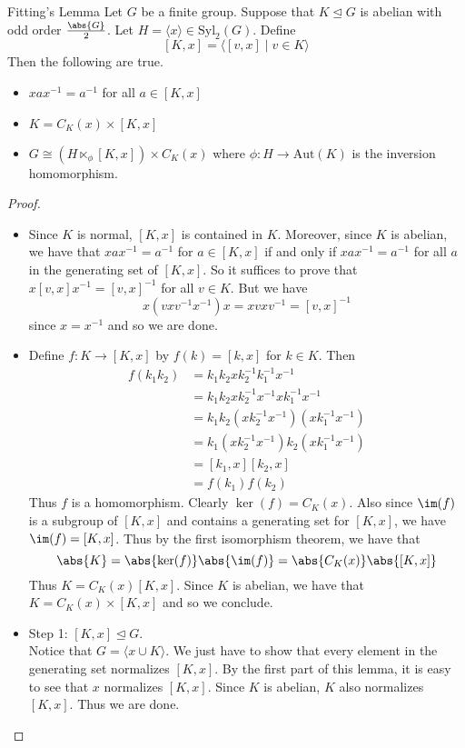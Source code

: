 \documentclass[a4paper]{article}
\begin{document}
\begin{lmm}{Fitting's Lemma}{} Let $G$ be a finite group. Suppose that $K\trianglelefteq G$ is abelian with odd order $\frac{\abs{G}}{2}$. Let $H=\langle x\rangle\in\text{Syl}_2(G)$. Define $$[K,x]=\langle[v,x]\;|\;v\in K\rangle$$ Then the following are true. 
\begin{itemize}
\item $xax^{-1}=a^{-1}$ for all $a\in[K,x]$
\item $K=C_K(x)\times[K,x]$
\item $G\cong(H\ltimes_\phi[K,x])\times C_K(x)$ where $\phi:H\to\text{Aut}(K)$ is the inversion homomorphism. 
\end{itemize} \tcbline
\begin{proof}~\\
\begin{itemize}
\item Since $K$ is normal, $[K,x]$ is contained in $K$. Moreover, since $K$ is abelian, we have that $xax^{-1}=a^{-1}$ for $a\in[K,x]$ if and only if $xax^{-1}=a^{-1}$ for all $a$ in the generating set of $[K,x]$. So it suffices to prove that $x[v,x]x^{-1}=[v,x]^{-1}$ for all $v\in K$. But we have $$x(vxv^{-1}x^{-1})x=xvxv^{-1}=[v,x]^{-1}$$ since $x=x^{-1}$ and so we are done. 
\item Define $f:K\to[K,x]$ by $f(k)=[k,x]$ for $k\in K$. Then 
\begin{align*}
f(k_1k_2)&=k_1k_2xk_2^{-1}k_1^{-1}x^{-1}\\
&=k_1k_2xk_2^{-1}x^{-1}xk_1^{-1}x^{-1}\\
&=k_1k_2(xk_2^{-1}x^{-1})(xk_1^{-1}x^{-1})\\
&=k_1(xk_2^{-1}x^{-1})k_2(xk_1^{-1}x^{-1})\tag{$K$ is abelian}\\
&=[k_1,x][k_2,x]\\
&=f(k_1)f(k_2)
\end{align*}
Thus $f$ is a homomorphism. Clearly $\ker(f)=C_K(x)$. Also since $\im(f)$ is a subgroup of $[K,x]$ and contains a generating set for $[K,x]$, we have $\im(f)=[K,x]$. Thus by the first isomorphism theorem, we have that $$\abs{K}=\abs{\ker(f)}\abs{\im(f)}=\abs{C_K(x)}\abs{[K,x]}$$ Thus $K=C_K(x)[K,x]$. Since $K$ is abelian, we have that $K=C_K(x)\times[K,x]$ and so we conclude. 
\item Step 1: $[K,x]\trianglelefteq G$. \\
Notice that $G=\langle x\cup K\rangle$. We just have to show that every element in the generating set normalizes $[K,x]$. By the first part of this lemma, it is easy to see that $x$ normalizes $[K,x]$. Since $K$ is abelian, $K$ also normalizes $[K,x]$. Thus we are done. 
\end{itemize}
\end{proof}
\end{lmm}
\end{document}
